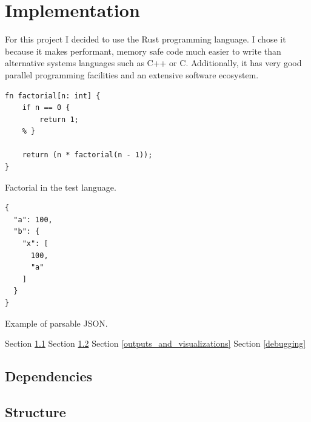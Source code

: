\chapter{Implementation} \label{implementation}

For this project I decided to use the Rust programming language. I chose
it because it makes performant, memory safe code much easier to write than
alternative systems languages such as C++ or C. Additionally, it has very good
parallel programming facilities and an extensive software ecosystem.


\begin{listing}[H]
\begin{verbatim}
fn factorial[n: int] {
    if n == 0 {
        return 1;
    % } 

    return (n * factorial(n - 1));
}
\end{verbatim}
\caption{Factorial in the test language.}
\label{lst:factorial_example}
\end{listing}

\begin{listing}[H]
\begin{verbatim}
{
  "a": 100,
  "b": {
    "x": [
      100,
      "a"
    ]
  }
}
\end{verbatim}
\caption{Example of parsable JSON.}
\hrulefill
\label{lst:json_example}
\end{listing}

Section \ref{dependancies}
\newline \newline
Section \ref{structure}
\newline \newline
Section \ref{outputs_and_visualizations}
\newline \newline
Section \ref{debugging}

\section{Dependencies} \label{dependancies}
\section{Structure} \label{structure}
